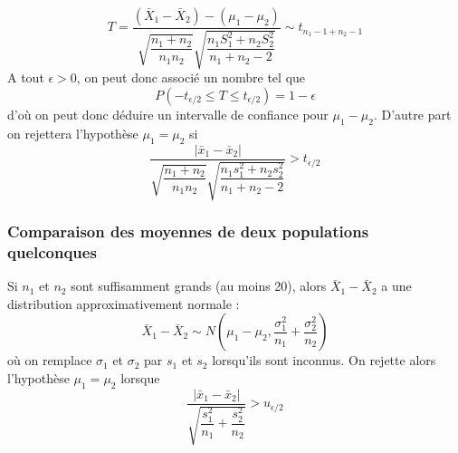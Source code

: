 $$\boxed{T = \dfrac{(\bar{X}_1 - \bar{X}_2) - (\mu_1 - \mu_2)}{\sqrt{\dfrac{n_1+n_2}{n_1n_2}}\sqrt{\dfrac{n_1S^2_1+n_2S_2^2}{n_1+n_2-2}}} \sim t_{n_1-1+n_2-1}}$$
A tout $\epsilon > 0$, on peut donc associé un nombre tel que $$P\left(-t_{\epsilon/2} \leq T \leq t_{\epsilon/2} \right) = 1 - \epsilon$$ d'où on peut donc déduire un intervalle de confiance pour $\mu_1 - \mu_2$. D'autre part on rejettera l'hypothèse $\mu_1 = \mu_2$ si $$\dfrac{|\bar{x}_1 - \bar{x}_2|}{\sqrt{\dfrac{n_1+n_2}{n_1n_2}}\sqrt{\dfrac{n_1s^2_1+n_2s_2^2}{n_1+n_2-2}}} > t_{\epsilon/2}$$








\newpage
\subsubsection{Comparaison des moyennes de deux populations quelconques}
Si $n_1$ et $n_2$ sont suffisamment grands (au moins 20), alors $\bar{X}_1 - \bar{X}_2$ a une distribution
approximativement normale :$$\boxed{\bar{X}_1 - \bar{X}_2 \sim N\left(\mu_1 - \mu_2, \dfrac{\sigma_1^2}{n_1} + \dfrac{\sigma_2^2}{n_2}\right)}$$
où on remplace $\sigma_1$ et $\sigma_2$ par $s_1$ et $s_2$ lorsqu'ils sont inconnus. On rejette alors l'hypothèse $\mu_1 = \mu_2$ lorsque $$\dfrac{\left|\bar{x}_1 - \bar{x}_2\right|}{\sqrt{\dfrac{s_1^2}{n_1} + \dfrac{s_2^2}{n_2}}} > u_{\epsilon/2}$$